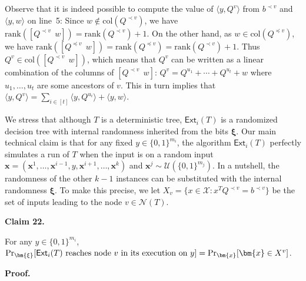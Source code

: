 \documentclass[10pt,a4paper]{article}
\begin{document}
Observe that it is indeed possible to compute the value of $\langle y,Q^{v}\rangle$ from $b^{\prec v}$ and $\langle y,w\rangle$ on line 5: Since $w\notin\mathrm{col}(Q^{\prec v})$, we have $\mathrm{rank}([Q^{\prec v}\>\>w])=\mathrm{rank}(Q^{\prec v})+1$.
On the other hand, as $w\in\mathrm{col}(Q^{\preceq v})$, we have $\mathrm{rank}([Q^{\preceq v}\>\>w])=\mathrm{rank}(Q^{\preceq v})=\mathrm{rank}(Q^{\prec v})+1$. Thus $Q^{v}\in\mathrm{col}([Q^{\prec v}\>\>w])$, which means that $Q^{v}$ can be written as a linear combination of the columns of $[Q^{\prec v}\>\>w]$: $Q^{v}=Q^{u_{1}}+\cdots+Q^{u_{t}}+w$ where $u_{1},\ldots,u_{t}$ are some ancestors of $v$. This in turn implies that $\langle y,Q^{v}\rangle=\sum_{i\in[t]}\langle y,Q^{u_{i}}\rangle+\langle y,w\rangle$.\par




We stress that although $T$ is a deterministic tree, $\mathsf{Ext}_{i}\mathopen{}\left(T\mathclose{}\right)$ is a randomized decision tree with internal randomness inherited from the bits $\bm{\xi}$. Our main technical claim is that for any fixed $y\in\{0,1\}^{m_{i}}$, the algorithm $\mathsf{Ext}_{i}\mathopen{}\left(T\mathclose{}\right)$ perfectly simulates a run of $T$ when the input is on a random input $\bm{x}=(\bm{x}^{1},\ldots,\bm{x}^{i-1},y,\bm{x}^{i+1},\ldots,\bm{x}^{k})$ and $\bm{x}^{j}\sim\mathcal{U}(\{0,1\}^{m_{j}})$. In a nutshell, the randomness of the other $k-1$ instances can be substituted with the internal randomness $\bm{\xi}$. To make this precise, we let $X_{v}=\{x\in\mathcal{X}:x^{T}Q^{\prec v}=b^{\prec v}\}$ be the set of inputs leading to the node $v\in\mathcal{N}(T)$.\par





\par\medskip\noindent\textbf{
Claim 22. 
}\par



For any $y\in\{0,1\}^{m_{i}}$, $\Pr_{\bm{\xi}}[\textup{$\mathsf{Ext}_{i}\mathopen{}\left(T\mathclose{}\right)$ reaches node $v$ in its execution on $y$}]=\Pr_{\bm{x}}[\bm{x}\in X^{v}]$.\par






\par\medskip\noindent\textbf{
\textbf{Proof}.}\par
\end{document}
